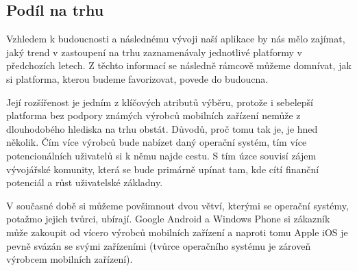 \documentclass[thesis=M,czech]{FITthesis}[2012/06/26]
\begin{document}
\subsection{Podíl na trhu}
Vzhledem k budoucnosti a následnému vývoji naší aplikace by nás mělo zajímat, jaký trend v zastoupení na trhu zaznamenávaly jednotlivé platformy v předchozích letech. Z těchto informací se následně rámcově můžeme domnívat, jak si platforma, kterou budeme favorizovat, povede do budoucna.

Její rozšířenost je jedním z klíčových atributů výběru, protože i sebelepší platforma bez podpory známých výrobců mobilních zařízení nemůže z dlouhodobého hlediska na trhu obstát. Důvodů, proč tomu tak je, je hned několik. Čím více výrobců bude nabízet daný operační systém, tím více potencionálních uživatelů si k němu najde cestu. S tím úzce souvisí zájem vývojářské komunity, která se bude primárně upínat tam, kde cítí finanční potenciál a růst uživatelské základny.

V současné době si můžeme povšimnout dvou větví, kterými se operační systémy, potažmo jejich tvůrci, ubírají. Google Android a Windows Phone si zákazník může zakoupit od vícero výrobců mobilních zařízení a naproti tomu Apple iOS je pevně svázán se svými zařízeními (tvůrce operačního systému je zároveň výrobcem mobilních zařízení).
\end{document}
